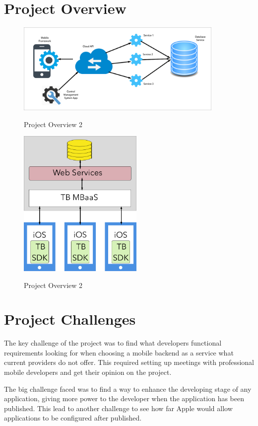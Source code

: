 \section{Project Overview}

\begin{figure}[h]
    \caption{Project Overview 2}
    \centering
    \includegraphics[width=100mm]{images/overview}
    \label{fig:project_overview1}
\end{figure}

\begin{figure}[h]
    \caption{Project Overview 2}
    \centering
    \includegraphics[width=60mm]{images/app_overview}
    \label{fig:project_overview2}
\end{figure}


\section{Project Challenges}

The key challenge of the project was to find what developers functional requirements looking for when choosing a mobile backend as a service what current providers do not offer. This required setting up meetings with professional mobile developers and get their opinion on the project.

The big challenge faced was to find a way to enhance the developing stage of any application, giving more power to the developer when the application has been published. This lead to another challenge to see how far Apple would allow applications to be configured after published.

